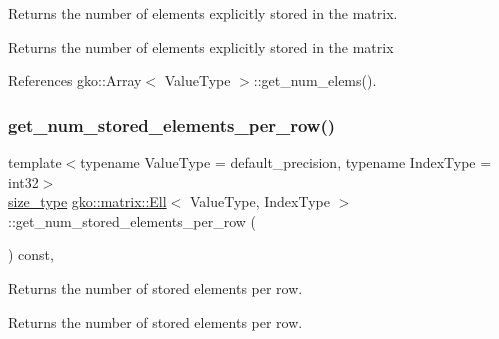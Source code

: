 Returns the number of elements explicitly stored in the matrix. 

\begin{DoxyReturn}{Returns}
the number of elements explicitly stored in the matrix 
\end{DoxyReturn}


References gko\+::\+Array$<$ Value\+Type $>$\+::get\+\_\+num\+\_\+elems().

\mbox{\label{classgko_1_1matrix_1_1Ell_a08f9b04b356e58ab57d03ce335ff11ce}} 
\subsubsection{\texorpdfstring{get\+\_\+num\+\_\+stored\+\_\+elements\+\_\+per\+\_\+row()}{get\_num\_stored\_elements\_per\_row()}}
{\footnotesize\ttfamily template$<$typename Value\+Type = default\+\_\+precision, typename Index\+Type = int32$>$ \\
\hyperlink{namespacegko_a6e5c95df0ae4e47aab2f604a22d98ee7}{size\+\_\+type} \hyperlink{classgko_1_1matrix_1_1Ell}{gko\+::matrix\+::\+Ell}$<$ Value\+Type, Index\+Type $>$\+::get\+\_\+num\+\_\+stored\+\_\+elements\+\_\+per\+\_\+row (\begin{DoxyParamCaption}{ }\end{DoxyParamCaption}) const\hspace{0.3cm}{\ttfamily [inline]}, {\ttfamily [noexcept]}}



Returns the number of stored elements per row. 

\begin{DoxyReturn}{Returns}
the number of stored elements per row. 
\end{DoxyReturn}
\mbox{\label{classgko_1_1matrix_1_1Ell_a0be6e75dcea0975b10e3389a9eedacc1}} 
